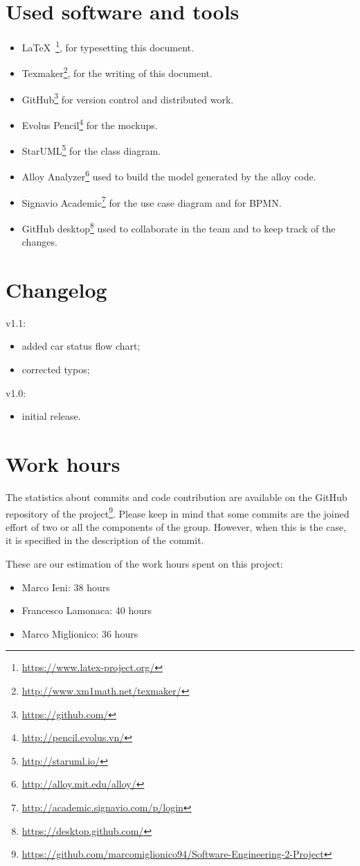 \section{Used software and tools}
\begin{itemize}
    \item \LaTeX\ \footnote{\url{https://www.latex-project.org/}}, for typesetting this document.
    \item Texmaker\footnote{\url{http://www.xm1math.net/texmaker/}}, for the writing of this document.
    \item GitHub\footnote{\url{https://github.com/}} for version control and distributed work.
    \item Evolus Pencil\footnote{\url{http://pencil.evolus.vn/}} for the mockups.
    \item StarUML\footnote{\url{http://staruml.io/}} for the class diagram.
    \item Alloy Analyzer\footnote{\url{http://alloy.mit.edu/alloy/}} used to build the model generated by the alloy code.
    \item Signavio Academic\footnote{\url{http://academic.signavio.com/p/login}} for the use case diagram and for BPMN.
    \item GitHub desktop\footnote{\url{https://desktop.github.com/}} used to collaborate in the team and to keep track of the changes. 
\end{itemize}

\section{Changelog}

v1.1:
\begin{itemize}
\item added car status flow chart;
\item corrected typos;
\end{itemize}

v1.0:
\begin{itemize}
\item initial release.
\end{itemize}

\section{Work hours}
The statistics about commits and code contribution are available on the GitHub repository of the project\footnote{\url{https://github.com/marcomiglionico94/Software-Engineering-2-Project}}.
Please keep in mind that some commits are the joined effort of two or all the components of the group. However, when this is the case, it is specified in the description of the commit.

These are our estimation of the work hours spent on this project:
\begin{itemize}
    \item Marco Ieni: 38 hours
    \item Francesco Lamonaca: 40 hours
    \item Marco Miglionico: 36 hours
\end{itemize}
